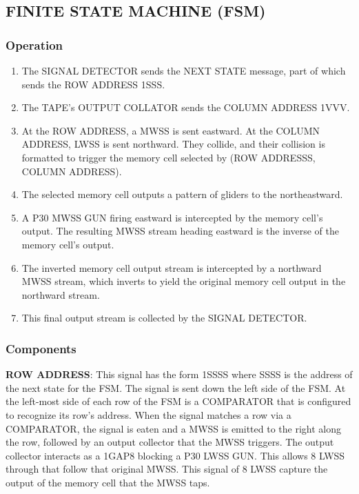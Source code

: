 \documentclass{article}
\begin{document}
\subsection{FINITE STATE MACHINE (FSM)}\subsubsection{Operation}

\begin{enumerate}
\item The SIGNAL DETECTOR sends the NEXT STATE message, part of which sends the ROW ADDRESS 1SSS.


\item The TAPE's OUTPUT COLLATOR sends the COLUMN ADDRESS 1VVV.


\item At the ROW ADDRESS, a MWSS is sent eastward. At the COLUMN ADDRESS, LWSS is sent northward. They collide, and their collision is formatted to trigger the memory cell selected by (ROW ADDRESSS, COLUMN ADDRESS).


\item The selected memory cell outputs a pattern of gliders to the northeastward.


\item A P30 MWSS GUN firing eastward is intercepted by the memory cell's output. The resulting MWSS stream heading eastward is the inverse of the memory cell's output.


\item The inverted memory cell output stream is intercepted by a northward MWSS stream, which inverts to yield the original memory cell output in the northward stream.


\item This final output stream is collected by the SIGNAL DETECTOR.

\end{enumerate}

\subsubsection{Components}
\noindent\textbf{ROW ADDRESS}: This signal has the form 1SSSS where SSSS is the address of the next state for the FSM. The signal is sent down the left side of the FSM. At the left-most side of each row of the FSM is a COMPARATOR that is configured to recognize its row's address. When the signal matches a row via a COMPARATOR, the signal is eaten and a MWSS is emitted to the right along the row, followed by an output collector that the MWSS triggers. The output collector interacts as a 1GAP8 blocking a P30 LWSS GUN. This allows 8 LWSS through that follow that original MWSS. This signal of 8 LWSS capture the output of the memory cell that the MWSS taps.
\end{document}
